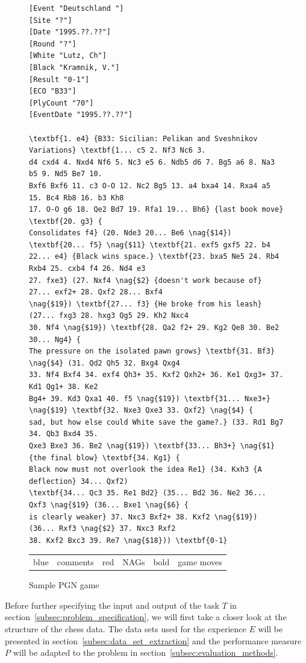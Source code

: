 \documentclass[article,type=msc,colorback,accentcolor=tud7b]{tudthesis}
\begin{document}
	\begin{figure}[H]
	  \centering
	  \begin{lstlisting}	  
[Event "Deutschland "]
[Site "?"]
[Date "1995.??.??"]
[Round "?"]
[White "Lutz, Ch"]
[Black "Kramnik, V."]
[Result "0-1"]
[ECO "B33"]
[PlyCount "70"]
[EventDate "1995.??.??"]

\textbf{1. e4} {B33: Sicilian: Pelikan and Sveshnikov Variations} \textbf{1... c5 2. Nf3 Nc6 3.
d4 cxd4 4. Nxd4 Nf6 5. Nc3 e5 6. Ndb5 d6 7. Bg5 a6 8. Na3 b5 9. Nd5 Be7 10.
Bxf6 Bxf6 11. c3 O-O 12. Nc2 Bg5 13. a4 bxa4 14. Rxa4 a5 15. Bc4 Rb8 16. b3 Kh8
17. O-O g6 18. Qe2 Bd7 19. Rfa1 19... Bh6} {last book move} \textbf{20. g3} {
Consolidates f4} (20. Nde3 20... Be6 \nag{$14}) \textbf{20... f5} \nag{$11} \textbf{21. exf5 gxf5 22. b4
22... e4} {Black wins space.} \textbf{23. bxa5 Ne5 24. Rb4 Rxb4 25. cxb4 f4 26. Nd4 e3
27. fxe3} (27. Nxf4 \nag{$2} {doesn't work because of} 27... exf2+ 28. Qxf2 28... Bxf4
\nag{$19}) \textbf{27... f3} {He broke from his leash} (27... fxg3 28. hxg3 Qg5 29. Kh2 Nxc4
30. Nf4 \nag{$19}) \textbf{28. Qa2 f2+ 29. Kg2 Qe8 30. Be2 30... Ng4} {
The pressure on the isolated pawn grows} \textbf{31. Bf3} \nag{$4} (31. Qd2 Qh5 32. Bxg4 Qxg4
33. Nf4 Bxf4 34. exf4 Qh3+ 35. Kxf2 Qxh2+ 36. Ke1 Qxg3+ 37. Kd1 Qg1+ 38. Ke2
Bg4+ 39. Kd3 Qxa1 40. f5 \nag{$19}) \textbf{31... Nxe3+} \nag{$19} \textbf{32. Nxe3 Qxe3 33. Qxf2} \nag{$4} {
sad, but how else could White save the game?.} (33. Rd1 Bg7 34. Qb3 Bxd4 35.
Qxe3 Bxe3 36. Be2 \nag{$19}) \textbf{33... Bh3+} \nag{$1} {the final blow} \textbf{34. Kg1} {
Black now must not overlook the idea Re1} (34. Kxh3 {A deflection} 34... Qxf2)
\textbf{34... Qc3 35. Re1 Bd2} (35... Bd2 36. Ne2 36... Qxf3 \nag{$19} (36... Bxe1 \nag{$6} {
is clearly weaker} 37. Nxc3 Bxf2+ 38. Kxf2 \nag{$19}) (36... Rxf3 \nag{$2} 37. Nxc3 Rxf2
38. Kxf2 Bxc3 39. Re7 \nag{$18})) \textbf{0-1}
	  \end{lstlisting}	  

      \caption{Sample PGN game}
      \begin{tabular}{r@{: }l r@{: }l r@{: }l}
        blue & comments & red & NAGs & bold & game moves
      \end{tabular}
      \label{fig:sample_pgn_game}
	\end{figure}
	
    Before further specifying the input and output of the task $T$ in section~\ref{subsec:problem_specification}, we will first take a closer look at the structure of the chess data. The data sets used for the experience $E$ will be presented in section~\ref{subsec:data_set_extraction} and the performance measure $P$ will be adapted to the problem in section~\ref{subsec:evaluation_methods}.
    
\end{document}
